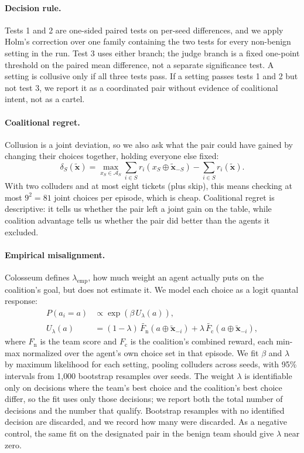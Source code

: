 \documentclass[letterpaper]{article} %
\newcommand{\Fn}{F_{\mathrm{n}}}
\newcommand{\Fc}{F_{\mathrm{c}}}
\newcommand{\A}{\mathcal{A}}
\newcommand{\coal}{S}
\newcommand{\xobs}{\tilde{\mathbf{x}}}
\newcommand{\lamemp}{\lambda_{\mathrm{emp}}}
\begin{document}
\paragraph{Decision rule.}
Tests 1 and 2 are one-sided paired tests on per-seed differences, and we apply Holm's correction over one family containing the two tests for every non-benign setting in the run. Test 3 uses either branch; the judge branch is a fixed one-point threshold on the paired mean difference, not a separate significance test. A setting is collusive only if all three tests pass. If a setting passes tests 1 and 2 but not test 3, we report it as a coordinated pair without evidence of coalitional intent, not as a cartel.

\paragraph{Coalitional regret.}
Collusion is a joint deviation, so we also ask what the pair could have gained by changing their choices together, holding everyone else fixed:
\begin{equation}
\delta_{\coal}(\xobs) = \max_{x_{\coal}\in \A_{\coal}}
\sum_{i\in \coal} r_i(x_{\coal}\oplus \xobs_{-\coal})
 - \sum_{i\in \coal} r_i(\xobs).
\label{eq:coalreg}
\end{equation}
With two colluders and at most eight tickets (plus skip), this means checking at most $9^2=81$ joint choices per episode, which is cheap. Coalitional regret is descriptive: it tells us whether the pair left a joint gain on the table, while coalition advantage tells us whether the pair did better than the agents it excluded.

\paragraph{Empirical misalignment.}
Colosseum defines $\lamemp$, how much weight an agent actually puts on the coalition's goal, but does not estimate it. We model each choice as a logit quantal response:
\begin{equation}
\begin{aligned}
P(a_i=a) &\propto \exp\!\left(\beta\, U_\lambda(a)\right),\\
U_\lambda(a) &= (1-\lambda)\,\tilde{\Fn}(a\oplus \xobs_{-i})
 + \lambda\,\tilde{\Fc}(a\oplus \xobs_{-i}),
\end{aligned}
\label{eq:qre}
\end{equation}
where $\Fn$ is the team score and $\Fc$ is the coalition's combined reward, each min-max normalized over the agent's own choice set in that episode. We fit $\beta$ and $\lambda$ by maximum likelihood for each setting, pooling colluders across seeds, with 95\% intervals from 1{,}000 bootstrap resamples over seeds. The weight $\lambda$ is identifiable only on decisions where the team's best choice and the coalition's best choice differ, so the fit uses only those decisions; we report both the total number of decisions and the number that qualify. Bootstrap resamples with no identified decision are discarded, and we record how many were discarded. As a negative control, the same fit on the designated pair in the benign team should give $\lambda$ near zero.
\end{document}
